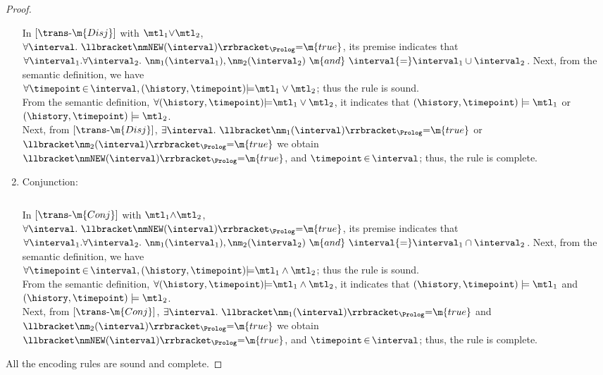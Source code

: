 \begin{proof}
\begin{enumerate}[itemsep=1.5em,leftmargin=!]
In $[\trans\text{-}\m{Disj}]$  with 
$\mtl_1{\vee}\mtl_2$, \\
$\forall \interval.~\llbracket \nmNEW(\interval) \rrbracket_{\Prolog} {=} \m{true}$, 
its premise indicates that \\ 
$\forall \interval_1. \forall \interval_2.~ \nm_1(\interval_1), \nm_2(\interval_2)~ \m{and} ~  \interval {=} \interval_1 \cup \interval_2$. 
Next, from the semantic definition, we have \\
$\forall  \timepoint\,{\in}\,\interval, 
(\history, \timepoint) {\models} \mtl_1 \vee \mtl_2$; thus the rule is sound. \\
From the semantic definition, $\forall   
(\history, \timepoint) {\models} \mtl_1 \vee \mtl_2$, it indicates that $(\history, \timepoint)\models\mtl_1$ or $(\history, \timepoint)\models\mtl_2$.\\
Next, from $[\trans\text{-}\m{Disj}]$, 
$\exists \interval.~\llbracket \nm_1(\interval) \rrbracket_{\Prolog} {=} \m{true}$ or $\llbracket \nm_2(\interval) \rrbracket_{\Prolog} {=} \m{true}$
we obtain  \\
$\llbracket \nmNEW(\interval) \rrbracket_{\Prolog} {=} \m{true}$,  and $\timepoint\,{\in}\,\interval$; 
thus, the rule is complete. 

\item Conjunction:
{
\small 
\begin{align*}

\end{align*}
\begin{align*}

\end{align*}
\vspace{-2mm}
}

In $[\trans\text{-}\m{Conj}]$  with 
$\mtl_1{\wedge}\mtl_2$, \\
$\forall \interval.~\llbracket \nmNEW(\interval) \rrbracket_{\Prolog} {=} \m{true}$, 
its premise indicates that \\ 
$\forall \interval_1. \forall \interval_2.~ \nm_1(\interval_1), \nm_2(\interval_2)~ \m{and} ~  \interval {=} \interval_1 \cap \interval_2$. 
Next, from the semantic definition, we have \\
$\forall  \timepoint\,{\in}\,\interval, 
(\history, \timepoint) {\models} \mtl_1 \wedge \mtl_2$; thus the rule is sound. \\
From the semantic definition, $\forall   
(\history, \timepoint) {\models} \mtl_1 \wedge \mtl_2$, it indicates that $(\history, \timepoint)\models\mtl_1$ and $(\history, \timepoint)\models\mtl_2$.\\
Next, from $[\trans\text{-}\m{Conj}]$, 
$\exists \interval.~\llbracket \nm_1(\interval) \rrbracket_{\Prolog} {=} \m{true}$ and $\llbracket \nm_2(\interval) \rrbracket_{\Prolog} {=} \m{true}$
we obtain  \\
$\llbracket \nmNEW(\interval) \rrbracket_{\Prolog} {=} \m{true}$,  and $\timepoint\,{\in}\,\interval$; 
thus, the rule is complete. 
\end{enumerate}
\vspace{3mm}

All the encoding rules are sound and complete. 

\end{proof}